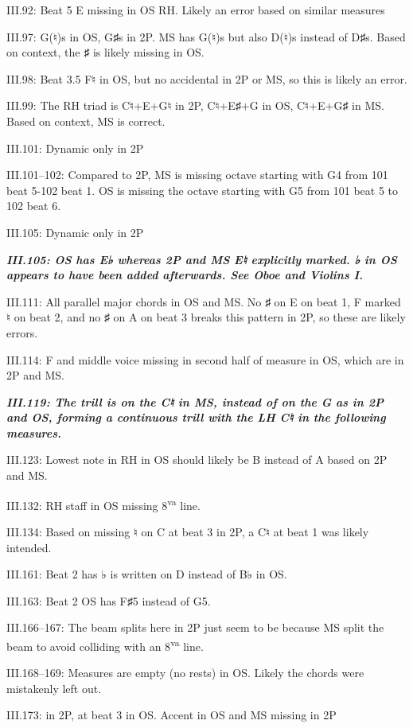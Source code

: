 \documentclass[twoside]{article}
\newcommand\dynmark[1]{\scalebox{0.9}{#1}{\kern1pt}}
\begin{document}
\begin{hangparas}{15pt}{1}
\begin{multicols}{2}
III.92: Beat 5 E missing in OS RH. Likely an error based on similar measures

III.97: G(♮)s in OS, G♯s in 2P. MS has G(♮)s but also D(♮)s instead of D♯s. Based on context, the ♯ is likely missing in OS.

III.98: Beat 3.5 F♮ in OS, but no accidental in 2P or MS, so this is likely an error.

III.99: The RH triad is C♮+E+G♮ in 2P, C♮+E♯+G in OS, C♮+E+G♯ in MS. Based on context, MS is correct.

III.101: Dynamic only in 2P

III.101--102: Compared to 2P, MS is missing octave starting with G4 from 101 beat 5-102 beat 1. OS is missing the octave starting with G5 from 101 beat 5 to 102 beat 6.

III.105: Dynamic only in 2P

\textbf{\textit{III.105: OS has E♭ whereas 2P and MS E♮ explicitly marked. ♭ in OS appears to have been added afterwards. See Oboe and Violins I.}}

III.111: All parallel major chords in OS and MS. No ♯ on E on beat 1, F marked ♮ on beat 2, and no ♯ on A on beat 3 breaks this pattern in 2P, so these are likely errors.

III.114: F and middle voice missing in second half of measure in OS, which are in 2P and MS.

\textbf{\textit{III.119: The trill is on the C♮ in MS, instead of on the G as in 2P and OS, forming a continuous trill with the LH C♮ in the following measures.}}

III.123: Lowest note in RH in OS should likely be B instead of A based on 2P and MS.

III.132: RH staff in OS missing 8\textsuperscript{va} line.

III.134: Based on missing ♮ on C at beat 3 in 2P, a C♮ at beat 1 was likely intended.

III.161: Beat 2 has ♭ is written on D instead of B♭ in OS.

III.163: Beat 2 OS has F♯5 instead of G5.

III.166--167: The beam splits here in 2P just seem to be because MS split the beam to avoid colliding with an 8\textsuperscript{va} line.

III.168--169: Measures are empty (no rests) in OS. Likely the chords were mistakenly left out.

III.173: \dynmark{\mezzopiano} in 2P, \dynmark{\mf} at beat 3 in OS. Accent in OS and MS missing in 2P


\end{multicols}
\end{hangparas}
\end{document}
